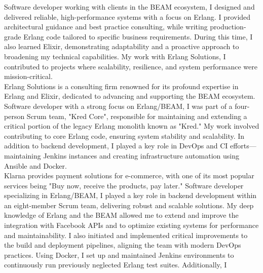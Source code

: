 \documentclass[purpleprocv]{procv}
\begin{document}
\begin{procv-twocolumns}
{          
          {Software developer working with clients in the BEAM ecosystem, I designed and delivered reliable, 
          high-performance systems with a focus on Erlang. I provided architectural guidance and best practice 
          consulting, while writing production-grade Erlang code tailored to specific business requirements. During this time, 
          I also learned Elixir, demonstrating adaptability and a proactive approach to broadening my technical capabilities. 
          My work with Erlang Solutions, I contributed to projects where scalability, resilience, and system performance were mission-critical.
          \\[3pt]
          Erlang Solutions is a consulting firm renowned for its profound expertise in Erlang and Elixir, 
          dedicated to advancing and supporting the BEAM ecosystem.}
          {Software developer with a strong focus on Erlang/BEAM, I was part of a four-person Scrum team, "Kred Core",
          responsible for maintaining and extending a critical portion of the legacy Erlang monolith known as "Kred." My 
          work involved contributing to core Erlang code, ensuring system stability and scalability. In addition to 
          backend development, I played a key role in DevOps and CI efforts—maintaining Jenkins instances and creating 
          infrastructure automation using Ansible and Docker.
          \\[3pt]
          Klarna provides payment solutions for e-commerce, with one of its most popular services being 
          "Buy now, receive the products, pay later."}
          {Software developer specializing in Erlang/BEAM, I played a key role in backend development within an 
          eight-member Scrum team, delivering robust and scalable solutions. My deep knowledge of Erlang and the BEAM 
          allowed me to extend and improve the integration with Facebook APIs and to 
          optimize existing systems for performance and maintainability. I also initiated and implemented critical improvements 
          to the build and deployment pipelines, aligning the team with modern DevOps practices. Using Docker, I set up 
          and maintained Jenkins environments to continuously run previously neglected Erlang test suites. Additionally, I 
}}
\end{procv-twocolumns}
\end{document}
